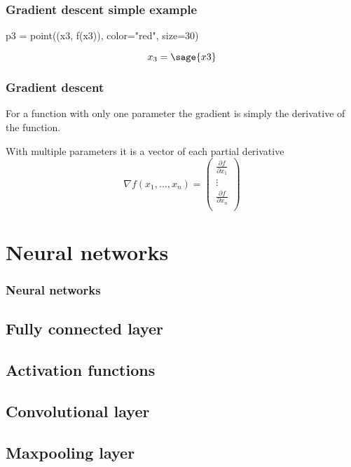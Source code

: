\documentclass{beamer}
\begin{document}
\begin{frame}[fragile]
    \frametitle{Gradient descent simple example}
    \begin{sageblock}
p3 = point((x3, f(x3)), color="red", size=30)
    \end{sageblock}
    \begin{figure}
        \centering
    \end{figure}
    $$x_3 = \sage{x3}$$
\end{frame}

\begin{frame}
    \frametitle{Gradient descent}
    For a function with only one parameter the gradient is simply the derivative of the function.

    With multiple parameters it is a vector of each partial derivative
    $$\nabla f(x_1, ..., x_n) = \left( \begin{array}{c}
    \frac{\partial f}{\partial x_1}\\
    \vdots\\
    \frac{\partial f}{\partial x_n}\\
\end{array} \right)$$
\end{frame}


\section{Neural networks}

\begin{frame}
    \frametitle{Neural networks}
\end{frame}

\subsection{Fully connected layer}

\subsection{Activation functions}

\subsection{Convolutional layer}

\subsection{Maxpooling layer}
\end{document}
